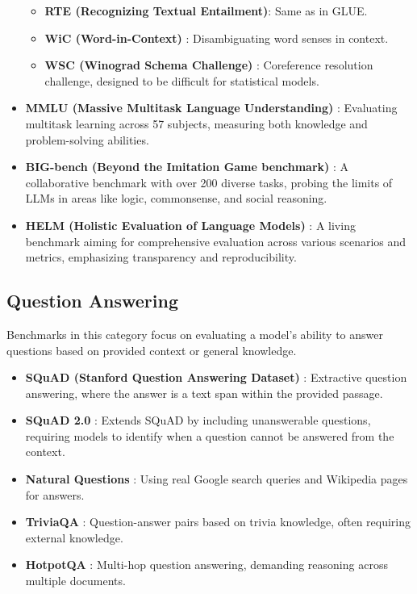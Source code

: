 \begin{itemize}
\begin{itemize}
        \item \textbf{RTE (Recognizing Textual Entailment)}: Same as in GLUE.
        \item \textbf{WiC (Word-in-Context)} \cite{pilehvar2018wic}: Disambiguating word senses in context.
        \item \textbf{WSC (Winograd Schema Challenge)} \cite{levesque2012winograd}: Coreference resolution challenge, designed to be difficult for statistical models.
    \end{itemize}
    \item \textbf{MMLU (Massive Multitask Language Understanding)} \cite{hendrycks2020measuring}: Evaluating multitask learning across 57 subjects, measuring both knowledge and problem-solving abilities.
    \item \textbf{BIG-bench (Beyond the Imitation Game benchmark)} \cite{srivastava2022beyond}: A collaborative benchmark with over 200 diverse tasks, probing the limits of LLMs in areas like logic, commonsense, and social reasoning.
    \item \textbf{HELM (Holistic Evaluation of Language Models)} \cite{liang2022holistic}: A living benchmark aiming for comprehensive evaluation across various scenarios and metrics, emphasizing transparency and reproducibility.
\end{itemize}

\subsection{Question Answering}

Benchmarks in this category focus on evaluating a model's ability to answer questions based on provided context or general knowledge.

\begin{itemize}
    \item \textbf{SQuAD (Stanford Question Answering Dataset)} \cite{rajpurkar2016squad}: Extractive question answering, where the answer is a text span within the provided passage.
    \item \textbf{SQuAD 2.0} \cite{rajpurkar2018know}: Extends SQuAD by including unanswerable questions, requiring models to identify when a question cannot be answered from the context.
    \item \textbf{Natural Questions} \cite{kwiatkowski2019natural}: Using real Google search queries and Wikipedia pages for answers.
    \item \textbf{TriviaQA} \cite{joshi2017triviaqa}: Question-answer pairs based on trivia knowledge, often requiring external knowledge.
    \item \textbf{HotpotQA} \cite{yang2018hotpotqa}: Multi-hop question answering, demanding reasoning across multiple documents.
\end{itemize}

